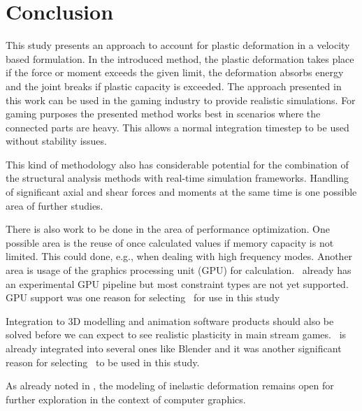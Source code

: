 \section{Conclusion}

This study presents an approach to account for plastic deformation in 
a velocity based formulation.
In the introduced method, the plastic deformation takes place if the force or moment exceeds the given 
limit, the deformation absorbs energy and the joint breaks if plastic capacity is exceeded. 
The approach presented in this work can be used in the gaming industry to provide realistic 
simulations. 
For gaming purposes the presented method works 
best in scenarios where the connected parts are heavy. This allows a normal 
integration timestep to be used without stability issues. 

This kind of methodology also has considerable potential for the combination of
the structural analysis methods with real-time simulation frameworks.
Handling of significant axial and shear forces and moments at the same time
is one possible area of further studies.

There is also work to be done in the area of performance optimization.
One possible area is the reuse of once calculated values if memory capacity is not limited.
This could done, e.g., when dealing with high frequency modes.
Another area is usage of the graphics processing unit (GPU) for calculation.
\cbullet\ already has an experimental GPU pipeline but most constraint types are not 
yet supported. GPU support was one reason for selecting
\cbullet\ for use in this study

Integration to 3D modelling and animation software products 
should also be solved before we can expect to
see realistic plasticity in main stream games. 
\cbullet\ is already integrated into several ones like Blender 
and it was another significant reason for selecting
\cbullet\  to be used in this study.

As already noted in \cite{cg1988}, the modeling of inelastic deformation
remains open for further exploration in the context of computer graphics.


